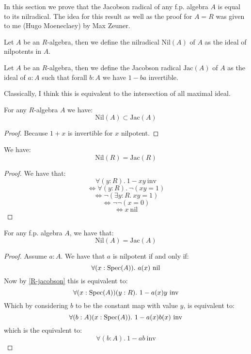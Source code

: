 In this section we prove that the Jacobson radical of any f.p. algebra $A$ is equal to its nilradical. The idea for this result as well as the proof for $A=R$ was given to me (Hugo Moeneclaey) by Max Zeuner.

\begin{definition}
Let $A$ be an $R$-algebra, then we define the nilradical $\mathrm{Nil}(A)$ of $A$ as the ideal of nilpotents in $A$.
\end{definition}

\begin{definition}
Let $A$ be an $R$-algebra, then we define the Jacobson radical $\mathrm{Jac}(A)$ of $A$ as the ideal of $a:A$ such that forall $b:A$ we have $1-ba$ invertible.
\end{definition}

Classically, I think this is equivalent to the intersection of all maximal ideal.

\begin{lemma}\label{nilradical-in-jacobson}
For any $R$-algebra $A$ we have:
\[\mathrm{Nil}(A) \subset \mathrm{Jac}(A)\]
\end{lemma}

\begin{proof}
Because $1+x$ is invertible for $x$ nilpotent.
\end{proof}

\begin{lemma}\label{R-jacobson}
We have:
\[\mathrm{Nil}(R) = \mathrm{Jac}(R)\]
\end{lemma}

\begin{proof}
We have that:
\[\forall (y:R).\ 1-xy\ \mathrm{inv}\]
\[\Leftrightarrow \forall (y:R).\ \neg(xy = 1) \]
\[\Leftrightarrow \neg (\exists y:R.\ xy=1) \]
\[\Leftrightarrow \neg\neg (x=0) \]
\[\Leftrightarrow x\ \mathrm{nil} \]
\end{proof}

\begin{proposition}
For any f.p. algebra $A$, we have that:
\[\mathrm{Nil}(A) = \mathrm{Jac}(A)\]
\end{proposition}

\begin{proof}
Assume $a:A$. We have that $a$ is nilpotent if and only if:
\[\forall (x:\operatorname{Spec}(A)).\ a(x)\ \mathrm{nil}\]
Now by \cref{R-jacobson} this is equivalent to:
\[ \forall (x:\operatorname{Spec}(A))(y:R).\ 1 - a(x)y\ \mathrm{inv}\]
Which by considering $b$ to be the constant map with value $y$, is equivalent to:
\[ \forall (b:A)(x:\operatorname{Spec}(A)).\ 1 - a(x)b(x)\ \mathrm{inv}\]
which is the equivalent to:
\[\forall (b:A).\ 1 - ab\ \mathrm{inv}\]
\end{proof}
